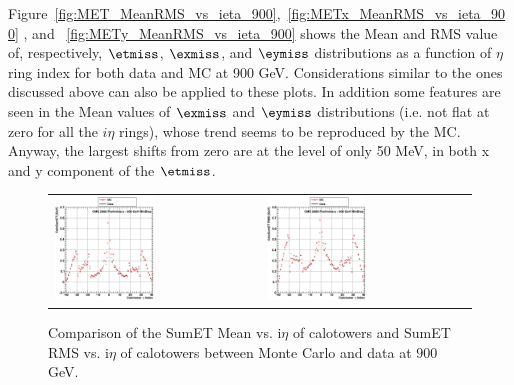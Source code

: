 Figure~\ref{fig:MET_MeanRMS_vs_ieta_900},~\ref{fig:METx_MeanRMS_vs_ieta_900}
, and ~\ref{fig:METy_MeanRMS_vs_ieta_900} shows the Mean and RMS value of, respectively,
$\etmiss$, $\exmiss$, and $\eymiss$ distributions as a function of $\eta$ ring 
index for both data and MC at 900 GeV.
Considerations similar to the ones discussed above can also be applied to these plots.
In addition some features are seen in the Mean values of $\exmiss$ and $\eymiss$ distributions
(i.e. not flat at zero for all the $i\eta$ rings), whose trend seems to be reproduced by the MC.
Anyway, the largest shifts from zero are at the level of only 50 MeV, in both x and y component of the $\etmiss$.

\begin{figure}[h!]
 \centering
 \begin{tabular}{ll}
  \includegraphics[width=0.5\textwidth]{plots_DataVsMC_MB_900GeV/g_caloSumetMean_vs_ieta_900.eps} &
  \includegraphics[width=0.5\textwidth]{plots_DataVsMC_MB_900GeV/g_caloSumetRMS_vs_ieta_900.eps} \\
 \end{tabular}
 \caption{\small Comparison of the SumET Mean vs. i$\eta$ of calotowers and SumET RMS vs. i$\eta$ of calotowers between 
          Monte Carlo and data at $900$ GeV.\label{fig:SumET_MeanRMS_vs_ieta_900}}
\end{figure}

